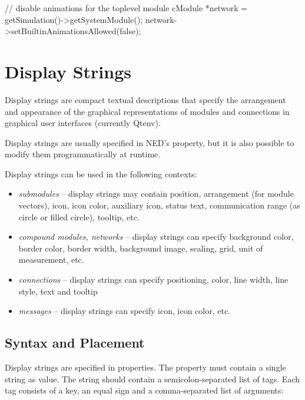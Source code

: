 \begin{cpp}
// disable animations for the toplevel module
cModule *network = getSimulation()->getSystemModule();
network->setBuiltinAnimationsAllowed(false);
\end{cpp}



\section{Display Strings}
\label{sec:graphics:display-strings}

Display strings are compact textual descriptions
that specify the arrangement and appearance of the graphical
representations of modules and connections in graphical user interfaces
(currently Qtenv).

Display strings are usually specified in NED's  property,
but it is also possible to modify them programmatically at runtime.

Display strings can be used in the following contexts:
\begin{itemize}
  \item \textit{submodules} -- display strings may contain position, arrangement
        (for module vectors), icon, icon color, auxiliary icon, status text,
        communication range (as circle or filled circle), tooltip, etc.
  \item \textit{compound modules, networks} -- display strings can specify
        background color, border color, border width,
        background image, scaling, grid, unit of measurement, etc.
  \item \textit{connections} -- display strings can specify positioning, color,
        line width, line style, text and tooltip
  \item \textit{messages} -- display strings can specify icon, icon color, etc.
\end{itemize}


\subsection{Syntax and Placement}
\label{sec:graphics:displaystring-syntax-and-placement}

Display strings are specified in  properties. The property
must contain a single string as value. The string should contain a
semicolon-separated list of tags. Each tag consists of a key, an equal sign
and a comma-separated list of arguments:

